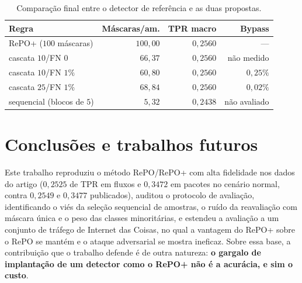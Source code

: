 \documentclass[conference]{IEEEtran}
\begin{document}
\begin{table}[!t]
\centering
\footnotesize
\setlength{\tabcolsep}{4pt}
\caption{Comparação final entre o detector de referência e as duas propostas.}
\label{tab:custo_robustez}
\begin{tabular}{@{}lrrr@{}}
\toprule
\textbf{Regra} & \textbf{Máscaras/am.} & \textbf{TPR macro} & \textbf{Bypass} \\
\midrule
RePO+ ($100$ máscaras) & $100{,}00$ & $0{,}2560$ & --- \\
cascata $10$/FN $0$ & $66{,}37$ & $0{,}2560$ & não medido \\
cascata $10$/FN $1\%$ & $60{,}80$ & $0{,}2560$ & $0{,}25\%$ \\
cascata $25$/FN $1\%$ & $68{,}84$ & $0{,}2560$ & $0{,}02\%$ \\
sequencial (blocos de $5$) & $5{,}32$ & $0{,}2438$ & não avaliado \\
\bottomrule
\end{tabular}
\end{table}

\section{Conclusões e trabalhos futuros}

Este trabalho reproduziu o método RePO/RePO+ com alta fidelidade nos dados do artigo ($0{,}2525$ de TPR em fluxos e $0{,}3472$ em pacotes no cenário normal, contra $0{,}2549$ e $0{,}3477$ publicados), auditou o protocolo de avaliação, identificando o viés da seleção sequencial de amostras, o ruído da reavaliação com máscara única e o peso das classes minoritárias, e estendeu a avaliação a um conjunto de tráfego de Internet das Coisas, no qual a vantagem do RePO+ sobre o RePO se mantém e o ataque adversarial se mostra ineficaz.
Sobre essa base, a contribuição que o trabalho defende é de outra natureza: \textbf{o gargalo de implantação de um detector como o RePO+ não é a acurácia, e sim o custo}.
\end{document}
